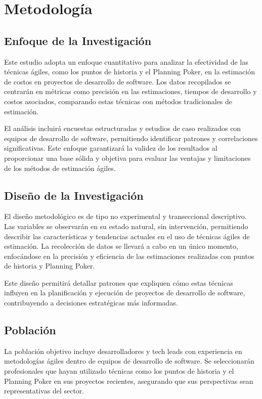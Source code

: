 \chapter{Metodología}

\section{Enfoque de la Investigación}

Este estudio adopta un enfoque cuantitativo para analizar la efectividad de las técnicas ágiles, como los puntos de historia y el Planning Poker, en la estimación de costos en proyectos de desarrollo de software. Los datos recopilados se centrarán en métricas como precisión en las estimaciones, tiempos de desarrollo y costos asociados, comparando estas técnicas con métodos tradicionales de estimación.

El análisis incluirá encuestas estructuradas y estudios de caso realizados con equipos de desarrollo de software, permitiendo identificar patrones y correlaciones significativas. Este enfoque garantizará la validez de los resultados al proporcionar una base sólida y objetiva para evaluar las ventajas y limitaciones de los métodos de estimación ágiles.

\section{Diseño de la Investigación}

El diseño metodológico es de tipo no experimental y transeccional descriptivo. Las variables se observarán en su estado natural, sin intervención, permitiendo describir las características y tendencias actuales en el uso de técnicas ágiles de estimación. La recolección de datos se llevará a cabo en un único momento, enfocándose en la precisión y eficiencia de las estimaciones realizadas con puntos de historia y Planning Poker.

Este diseño permitirá detallar patrones que expliquen cómo estas técnicas influyen en la planificación y ejecución de proyectos de desarrollo de software, contribuyendo a decisiones estratégicas más informadas.

\section{Población}

La población objetivo incluye desarrolladores y tech leads con experiencia en metodologías ágiles dentro de equipos de desarrollo de software. Se seleccionarán profesionales que hayan utilizado técnicas como los puntos de historia y el Planning Poker en sus proyectos recientes, asegurando que sus perspectivas sean representativas del sector.

